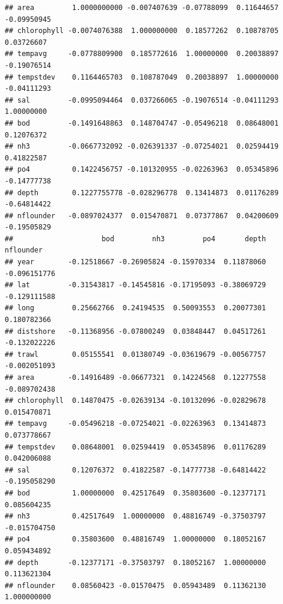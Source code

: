 \documentclass[
]{article}
\begin{document}
\begin{verbatim}
## area         1.0000000000 -0.007407639 -0.07788099  0.11644657 -0.09950945
## chlorophyll -0.0074076388  1.000000000  0.18577262  0.10878705  0.03726607
## tempavg     -0.0778809900  0.185772616  1.00000000  0.20038897 -0.19076514
## tempstdev    0.1164465703  0.108787049  0.20038897  1.00000000 -0.04111293
## sal         -0.0995094464  0.037266065 -0.19076514 -0.04111293  1.00000000
## bod         -0.1491648863  0.148704747 -0.05496218  0.08648001  0.12076372
## nh3         -0.0667732092 -0.026391337 -0.07254021  0.02594419  0.41822587
## po4          0.1422456757 -0.101320955 -0.02263963  0.05345896 -0.14777738
## depth        0.1227755778 -0.028296778  0.13414873  0.01176289 -0.64814422
## nflounder   -0.0897024377  0.015470871  0.07377867  0.04200609 -0.19505829
##                     bod         nh3         po4       depth    nflounder
## year        -0.12518667 -0.26905824 -0.15970334  0.11878060 -0.096151776
## lat         -0.31543817 -0.14545816 -0.17195093 -0.38069729 -0.129111588
## long         0.25662766  0.24194535  0.50093553  0.20077301  0.180782366
## distshore   -0.11368956 -0.07800249  0.03848447  0.04517261 -0.132022226
## trawl        0.05155541  0.01380749 -0.03619679 -0.00567757 -0.002051093
## area        -0.14916489 -0.06677321  0.14224568  0.12277558 -0.089702438
## chlorophyll  0.14870475 -0.02639134 -0.10132096 -0.02829678  0.015470871
## tempavg     -0.05496218 -0.07254021 -0.02263963  0.13414873  0.073778667
## tempstdev    0.08648001  0.02594419  0.05345896  0.01176289  0.042006088
## sal          0.12076372  0.41822587 -0.14777738 -0.64814422 -0.195058290
## bod          1.00000000  0.42517649  0.35803600 -0.12377171  0.085604235
## nh3          0.42517649  1.00000000  0.48816749 -0.37503797 -0.015704750
## po4          0.35803600  0.48816749  1.00000000  0.18052167  0.059434892
## depth       -0.12377171 -0.37503797  0.18052167  1.00000000  0.113621304
## nflounder    0.08560423 -0.01570475  0.05943489  0.11362130  1.000000000
\end{verbatim}
\end{document}
